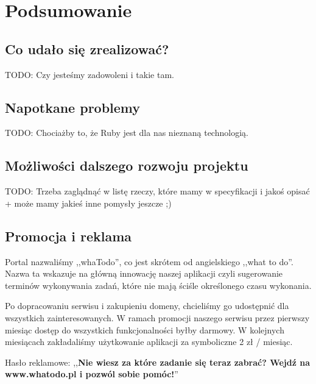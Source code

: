 \documentclass[pdflatex,11pt]{aghdpl}
\begin{document}


\chapter{Podsumowanie}

\section{Co udało się zrealizować?}

TODO: Czy jesteśmy zadowoleni i takie tam.

\section{Napotkane problemy}

TODO: Chociażby to, że Ruby jest dla nas nieznaną technologią.

\section{Możliwości dalszego rozwoju projektu}

TODO: Trzeba zaglądnąć w listę rzeczy, które mamy w specyfikacji i jakoś opisać + może mamy jakieś inne pomysły jeszcze ;)

\section{Promocja i reklama}

Portal nazwaliśmy ,,whaTodo'', co jest skrótem od angielskiego ,,what to do''. Nazwa ta wskazuje na główną innowację naszej aplikacji czyli sugerowanie terminów wykonywania zadań, które nie mają ściśle określonego czasu wykonania.

Po dopracowaniu serwisu i zakupieniu domeny, chcieliśmy go udostępnić dla wszystkich zainteresowanych. W ramach promocji naszego serwisu przez pierwszy miesiąc dostęp do wszystkich funkcjonalności byłby darmowy. W kolejnych miesiącach zakładaliśmy użytkowanie aplikacji za symboliczne 2 zł / miesiąc.

Hasło reklamowe: ,,\textbf{Nie wiesz za które zadanie się teraz zabrać? Wejdź na www.whatodo.pl i pozwól sobie
pomóc!}''
\end{document}
